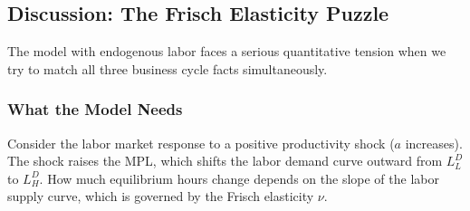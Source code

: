 \subsection{Discussion: The Frisch Elasticity Puzzle}

The model with endogenous labor faces a serious quantitative tension when we try to match all three business cycle facts simultaneously.

\subsubsection*{What the Model Needs}

Consider the labor market response to a positive productivity shock ($a$ increases). The shock raises the MPL, which shifts the labor demand curve outward from $L^D_L$ to $L^D_H$. How much equilibrium hours change depends on the slope of the labor supply curve, which is governed by the Frisch elasticity $\nu$.


